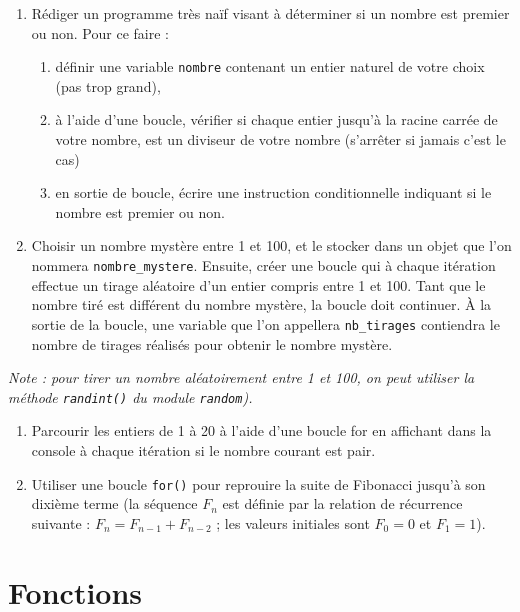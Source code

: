 \documentclass[
  12pt,
]{book}
\makeatletter
\providecommand{\tightlist}{%
  \setlength{\itemsep}{0pt}\setlength{\parskip}{0pt}}
\numberwithin{equation}{section}
\numberwithin{countremarque}{section}
\newenvironment{exframe}{%
 \def\at@end@of@exframe{}%
 \ifinner\ifhmode%
  \def\at@end@of@exframe{\end{minipage}}%
  \begin{minipage}{\columnwidth}%
 \fi\fi%
 \def\FrameCommand##1{\hskip\@totalleftmargin \hskip-\fboxsep
 \colorbox{shadecolorex}{##1}\hskip-\fboxsep
     \hskip-\linewidth \hskip-\@totalleftmargin \hskip\columnwidth}%
 \MakeFramed {\advance\hsize-\width
   \@totalleftmargin\z@ \linewidth\hsize
   \@setminipage}}%
 {\par\unskip\endMakeFramed%
 \at@end@of@exframe}
\makeatother
\begin{document}
\begin{exframe}
\begin{enumerate}
\def\labelenumi{\arabic{enumi}.}
\item
  Rédiger un programme très naïf visant à déterminer si un nombre est premier ou non. Pour ce faire :

  \begin{enumerate}
  \def\labelenumii{\arabic{enumii}.}
  \tightlist
  \item
    définir une variable \texttt{nombre} contenant un entier naturel de votre choix (pas trop grand),
  \item
    à l'aide d'une boucle, vérifier si chaque entier jusqu'à la racine carrée de votre nombre, est un diviseur de votre nombre (s'arrêter si jamais c'est le cas)
  \item
    en sortie de boucle, écrire une instruction conditionnelle indiquant si le nombre est premier ou non.
  \end{enumerate}
\item
  Choisir un nombre mystère entre 1 et 100, et le stocker dans un objet que l'on nommera \texttt{nombre\_mystere}. Ensuite, créer une boucle qui à chaque itération effectue un tirage aléatoire d'un entier compris entre 1 et 100. Tant que le nombre tiré est différent du nombre mystère, la boucle doit continuer. À la sortie de la boucle, une variable que l'on appellera \texttt{nb\_tirages} contiendra le nombre de tirages réalisés pour obtenir le nombre mystère.
\end{enumerate}

\emph{Note : pour tirer un nombre aléatoirement entre 1 et 100, on peut utiliser la méthode \texttt{randint()} du module \texttt{random}).}

\begin{enumerate}
\def\labelenumi{\arabic{enumi}.}
\setcounter{enumi}{2}
\tightlist
\item
  Parcourir les entiers de 1 à 20 à l'aide d'une boucle for en affichant dans la console à chaque itération si le nombre courant est pair.
\item
  Utiliser une boucle \texttt{for()} pour reprouire la suite de Fibonacci jusqu'à son dixième terme (la séquence \(F_n\) est définie par la relation de récurrence suivante : \(F_n = F_{n-1} + F_{n-2}\) ; les valeurs initiales sont \(F_0 = 0\) et \(F_1 = 1\)).
\end{enumerate}
\end{exframe}

\chapter{Fonctions}\label{fonctions}
\end{document}
